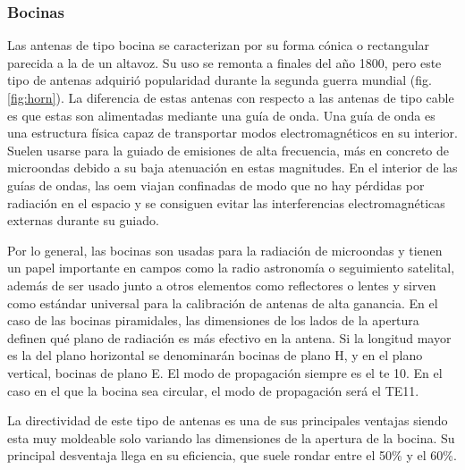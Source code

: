 \subsubsection{Bocinas}

\par Las antenas de tipo bocina se caracterizan por su forma cónica o rectangular parecida a la de un altavoz. Su uso se remonta a finales del año 1800, pero este tipo de antenas adquirió popularidad durante la segunda guerra mundial (fig. \ref{fig:horn}). La diferencia de estas antenas con respecto a las antenas de tipo cable es que estas son alimentadas mediante una guía de onda. Una guía de onda es una estructura física capaz de transportar modos electromagnéticos en su interior. Suelen usarse para la guiado de emisiones de alta frecuencia, más en concreto de microondas debido a su baja atenuación en estas magnitudes. En el interior de las guías de ondas, las \gls{oem} viajan confinadas de modo que no hay pérdidas por radiación en el espacio y se consiguen evitar las interferencias electromagnéticas externas durante su guiado.
\\
\par Por lo general, las bocinas son usadas para la radiación de microondas y tienen un papel importante en campos como la radio astronomía o seguimiento satelital, además de ser usado junto a otros elementos como reflectores o lentes y sirven como estándar universal para la calibración de antenas de alta ganancia. En el caso de las bocinas piramidales, las dimensiones de los lados de la apertura definen qué plano de radiación es más efectivo en la antena. Si la longitud mayor es la del plano horizontal se denominarán bocinas de plano H, y en el plano vertical, bocinas de plano E. El modo de propagación siempre es el \gls{te} 10. En el caso en el que la bocina sea circular, el modo de propagación será el TE11.
\\
\par La directividad de este tipo de antenas es una de sus principales ventajas siendo esta muy moldeable solo variando las dimensiones de la apertura de la bocina. Su principal desventaja llega en su eficiencia, que suele rondar entre el 50\% y el 60\%.
